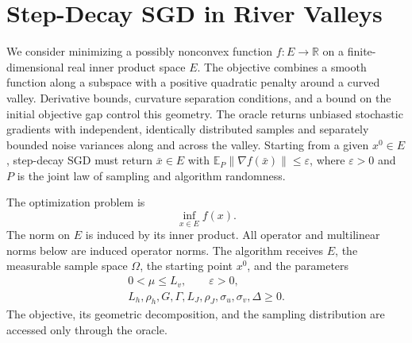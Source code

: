 \documentclass[10pt]{article}
\theoremstyle{definition}
\begin{document}
\section*{Step-Decay SGD in River Valleys}
We consider minimizing a possibly nonconvex function $f:E\to\mathbb{R}$ on a finite-dimensional real inner product space $E$. The objective combines a smooth function along a subspace with a positive quadratic penalty around a curved valley. Derivative bounds, curvature separation conditions, and a bound on the initial objective gap control this geometry. The oracle returns unbiased stochastic gradients with independent, identically distributed samples and separately bounded noise variances along and across the valley. Starting from a given $x^0\in E$, step-decay SGD must return $\bar{x}\in E$ with $\mathbb{E}_{P}\|\nabla f(\bar{x})\|\leq\varepsilon$, where $\varepsilon>0$ and $P$ is the joint law of sampling and algorithm randomness.

The optimization problem is
\[
\inf_{x\in E} f(x).
\]
The norm on $E$ is induced by its inner product. All operator and multilinear norms below are induced operator norms. The algorithm receives $E$, the measurable sample space $\Omega$, the starting point $x^0$, and the parameters
\[
\begin{gathered}
0<\mu\leq L_v,\qquad \varepsilon>0,\\
L_h,\rho_h,G,\Gamma,L_J,\rho_J,\sigma_u,\sigma_v,\Delta\geq0.
\end{gathered}
\]
The objective, its geometric decomposition, and the sampling distribution are accessed only through the oracle.
\end{document}
